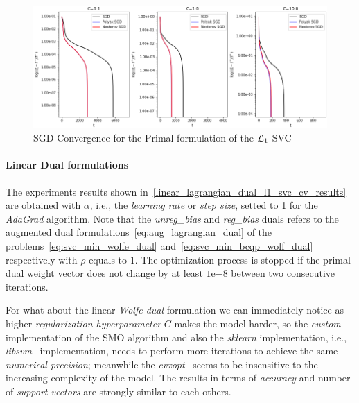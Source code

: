\begin{figure}[H]
	\centering
	\includegraphics[scale=0.55]{img/l1_svc_loss_history}
	\caption{SGD Convergence for the Primal formulation of the $\protect \mathcal{L}_1$-SVC}
	\label{fig:l1_svc_history}
\end{figure}

\paragraph{Linear Dual formulations}

The experiments results shown in~\ref{linear_lagrangian_dual_l1_svc_cv_results} are obtained with $\alpha$, i.e., the \emph{learning rate} or \emph{step size}, setted to 1 for the \emph{AdaGrad} algorithm. Note that the \emph{unreg\_bias} and \emph{reg\_bias} duals refers to the augmented dual formulations~\eqref{eq:aug_lagrangian_dual} of the problems~\eqref{eq:svc_min_wolfe_dual} and~\eqref{eq:svc_min_bcqp_wolf_dual} respectively with $\rho$ equals to 1. The optimization process is stopped if the primal-dual weight vector does not change by at least $1\mathrm{e}{-8}$  between two consecutive iterations.



For what about the linear \emph{Wolfe dual} formulation we can immediately notice as higher \emph{regularization hyperparameter} $C$ makes the model harder, so the \emph{custom} implementation of the SMO algorithm and also the \emph{sklearn} implementation, i.e., \emph{libsvm}~\cite{chang2011libsvm} implementation, needs to perform more iterations to achieve the same \emph{numerical precision}; meanwhile the \emph{cvxopt}~\cite{vandenberghe2010cvxopt} seems to be insensitive to the increasing complexity of the model. The results in terms of \emph{accuracy} and number of \emph{support vectors} are strongly similar to each others.



